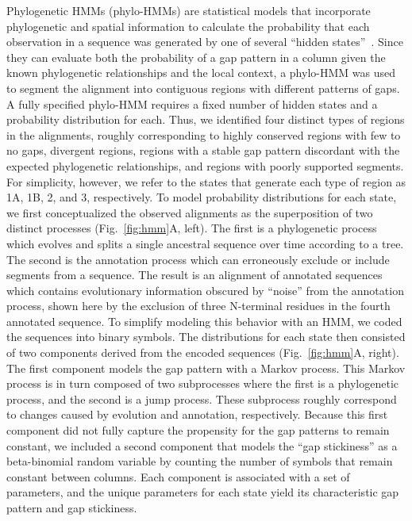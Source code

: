 Phylogenetic HMMs (phylo-HMMs) are statistical models that incorporate phylogenetic and spatial information to calculate the probability that each observation in a sequence was generated by one of several “hidden states”~\cite{Felsenstein1996}. Since they can evaluate both the probability of a gap pattern in a column given the known phylogenetic relationships and the local context, a phylo-HMM was used to segment the alignment into contiguous regions with different patterns of gaps. A fully specified phylo-HMM requires a fixed number of hidden states and a probability distribution for each. Thus, we identified four distinct types of regions in the alignments, roughly corresponding to highly conserved regions with few to no gaps, divergent regions, regions with a stable gap pattern discordant with the expected phylogenetic relationships, and regions with poorly supported segments. For simplicity, however, we refer to the states that generate each type of region as 1A, 1B, 2, and 3, respectively. To model probability distributions for each state, we first conceptualized the observed alignments as the superposition of two distinct processes (Fig.~\ref{fig:hmm}A, left). The first is a phylogenetic process which evolves and splits a single ancestral sequence over time according to a tree. The second is the annotation process which can erroneously exclude or include segments from a sequence. The result is an alignment of annotated sequences which contains evolutionary information obscured by ``noise'' from the annotation process, shown here by the exclusion of three N-terminal residues in the fourth annotated sequence. To simplify modeling this behavior with an HMM, we coded the sequences into binary symbols. The distributions for each state then consisted of two components derived from the encoded sequences (Fig.~\ref{fig:hmm}A, right). The first component models the gap pattern with a Markov process. This Markov process is in turn composed of two subprocesses where the first is a phylogenetic process, and the second is a jump process. These subprocess roughly correspond to changes caused by evolution and annotation, respectively. Because this first component did not fully capture the propensity for the gap patterns to remain constant, we included a second component that models the ``gap stickiness'' as a beta-binomial random variable by counting the number of symbols that remain constant between columns. Each component is associated with a set of parameters, and the unique parameters for each state yield its characteristic gap pattern and gap stickiness.

